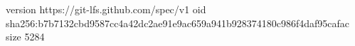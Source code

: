 version https://git-lfs.github.com/spec/v1
oid sha256:b7b7132cbd9587cc4a42dc2ae91e9ac659a941b928374180c986f4daf95cafac
size 5284
